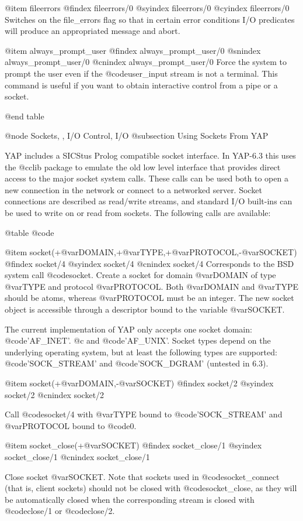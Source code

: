 {{{{{{@item fileerrors
@findex fileerrors/0
@syindex fileerrors/0
@cyindex fileerrors/0
Switches on the file_errors flag so that in certain error conditions
I/O predicates will produce an appropriated message and abort.

@item always_prompt_user
@findex always_prompt_user/0
@snindex always_prompt_user/0
@cnindex always_prompt_user/0
Force the system to prompt the user even if the @code{user_input} stream
is not a terminal. This command is useful if you want to obtain
interactive control from a pipe or a socket.

@end table

@node Sockets, , I/O Control, I/O
@subsection Using Sockets From YAP

YAP includes a SICStus Prolog compatible socket interface. In YAP-6.3
this uses the @c{clib} package to emulate the old low level interface that
provides direct access to the major socket system calls. These calls
can be used both to open a new connection in the network or connect to
a networked server. Socket connections are described as read/write
streams, and standard I/O built-ins can be used to write on or read
from sockets. The following calls are available:

@table @code

@item socket(+@var{DOMAIN},+@var{TYPE},+@var{PROTOCOL},-@var{SOCKET})
@findex socket/4
@syindex socket/4
@cnindex socket/4
Corresponds to the BSD system call @code{socket}. Create a socket for
domain @var{DOMAIN} of type @var{TYPE} and protocol
@var{PROTOCOL}. Both @var{DOMAIN} and @var{TYPE} should be atoms,
whereas @var{PROTOCOL} must be an integer.
The new socket object is
accessible through a descriptor bound to the variable @var{SOCKET}.

The current implementation of YAP only accepts one socket
domain: @code{'AF_INET'}. @c and @code{'AF_UNIX'}. 
Socket types depend on the
underlying operating system, but at least the following types are
supported: @code{'SOCK_STREAM'} and @code{'SOCK_DGRAM'} (untested in 6.3).

@item socket(+@var{DOMAIN},-@var{SOCKET})
@findex socket/2
@syindex socket/2
@cnindex socket/2

Call @code{socket/4} with @var{TYPE} bound to @code{'SOCK_STREAM'} and
@var{PROTOCOL} bound to @code{0}.

@item socket_close(+@var{SOCKET})
@findex socket_close/1
@syindex socket_close/1
@cnindex socket_close/1

Close socket @var{SOCKET}. Note that sockets used in
@code{socket_connect} (that is, client sockets) should not be closed with
@code{socket_close}, as they will be automatically closed when the
corresponding stream is closed with @code{close/1} or @code{close/2}.

}}}}}}
